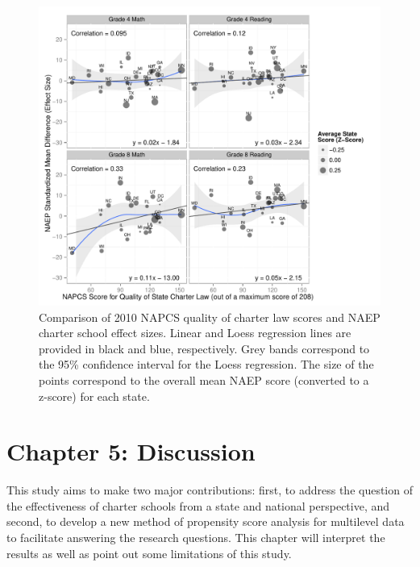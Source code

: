 \documentclass[letterpaper,12p,twoside]{article} %
\begin{document}
\begin{figure}[t]
\begin{center}
\includegraphics[width=\textwidth]{../Figures2009/LawScoresVsNAEPDifferences.pdf}
\caption[Comparison of 2010 NAPCS quality of charter law scores and NAEP charter school effect sizes]{Comparison of 2010 NAPCS quality of charter law scores and NAEP charter school effect sizes. Linear and Loess regression lines are provided in black and blue, respectively. Grey bands correspond to the 95\% confidence interval for the Loess regression. The size of the points correspond to the overall mean NAEP score (converted to a z-score) for each state.}
\label{fig:staterankings}
\end{center}
\end{figure}


\cleardoublepage
\section{Chapter 5: Discussion}

This study aims to make two major contributions: first, to address the question of the effectiveness of charter schools from a state and national perspective, and second, to develop a new method of propensity score analysis for multilevel data to facilitate answering the research questions. This chapter will interpret the results as well as point out some limitations of this study.
\end{document}
